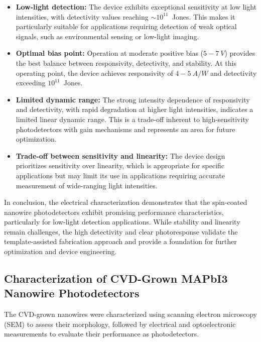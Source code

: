 \documentclass{rapportCS}
\begin{document}
	\begin{itemize}
		\item \textbf{Low-light detection:} The device exhibits exceptional sensitivity at low light intensities, with detectivity values reaching $\sim 10^{11}$~Jones. This makes it particularly suitable for applications requiring detection of weak optical signals, such as environmental sensing or low-light imaging.
		
		\item \textbf{Optimal bias point:} Operation at moderate positive bias ($5 - 7~V$) provides the best balance between responsivity, detectivity, and stability. At this operating point, the device achieves responsivity of $4 - 5~A/W$ and detectivity exceeding $10^{11}$~Jones.
		
		\item \textbf{Limited dynamic range:} The strong intensity dependence of responsivity and detectivity, with rapid degradation at higher light intensities, indicates a limited linear dynamic range. This is a trade-off inherent to high-sensitivity photodetectors with gain mechanisms and represents an area for future optimization.
		
		\item \textbf{Trade-off between sensitivity and linearity:} The device design prioritizes sensitivity over linearity, which is appropriate for specific applications but may limit its use in applications requiring accurate measurement of wide-ranging light intensities.
	\end{itemize}
	
	In conclusion, the electrical characterization demonstrates that the spin-coated  nanowire photodetectors exhibit promising performance characteristics, particularly for low-light detection applications. While stability and linearity remain challenges, the high detectivity and clear photoresponse validate the template-assisted fabrication approach and provide a foundation for further optimization and device engineering.
	
	
	
	\subsection{Characterization of CVD-Grown MAPbI3 Nanowire Photodetectors}
	
	The CVD-grown  nanowires were characterized using scanning electron microscopy (SEM) to assess their morphology, followed by electrical and optoelectronic measurements to evaluate their performance as photodetectors.
	
\end{document}
